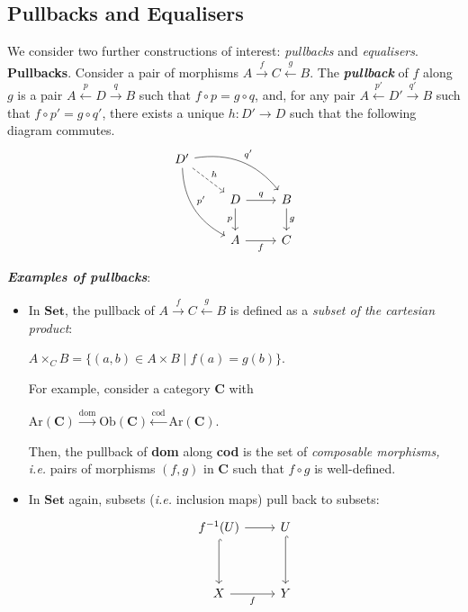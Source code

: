 \documentclass[]{amsbook}
\newcommand{\catname}[1]{\mathbf{#1}}
\newcommand{\0}{\mathbf{0}}
\newcommand{\1}{\mathbf{1}}
\begin{document}
\subsection*{Pullbacks and Equalisers}
We consider two further constructions of interest: \emph{pullbacks} and
\emph{equalisers}.\\

\textbf{Pullbacks}. Consider a pair of morphisms $A \xrightarrow{f} C
\xleftarrow{g} B$. The \emph{\textbf{pullback}} of $f$ along $g$ is a pair
$A \xleftarrow{p} D \xrightarrow{q} B$ such that $f \circ p = g \circ q$, and,
for any pair $A \xleftarrow{p'} D' \xrightarrow{q'} B$ such that $f \circ p' =
g \circ q'$, there exists a unique $h: D' \to D$ such that the following
diagram commutes.
\[
\begin{tikzcd}
    D' \arrow[drr, bend left, "q'"]
       \arrow[ddr, bend right, "p'"]
       \arrow[dr, dashed, "h"] & & \\
    & D \arrow[r, "q"]
        \arrow[d, swap, "p"]
    & B \arrow[d, "g"] \\
    & A \arrow[r, swap, "f"] & C
\end{tikzcd}
\]

\emph{\textbf{Examples of pullbacks}}:
\begin{itemize}
    \item In $\catname{Set}$, the pullback of $A \xrightarrow{f} C
    \xleftarrow{g} B$ is defined as a \emph{subset of the cartesian product}:
    \begin{center}
        $A \times_C B = \{ (a, b) \in A \times B \mid f(a) = g(b) \}$.
    \end{center}
    For example, consider a category $\catname{C}$ with
    \begin{center}
        $\text{Ar}(\catname{C}) \xrightarrow{\text{dom}} \text{Ob}(\catname{C})
        \xleftarrow{\text{cod}} \text{Ar}(\catname{C})$.
    \end{center}
    Then, the pullback of \textbf{dom} along \textbf{cod} is the set of
    \emph{composable morphisms, i.e.} pairs of morphisms $(f, g)$ in
    $\catname{C}$ such that $f \circ g$ is well-defined.
    \item In $\catname{Set}$ again, subsets (\emph{i.e.} inclusion maps) pull
    back to subsets:
    \[
    \begin{tikzcd}
        f^{-1}(U)
            \arrow[r]
            \arrow[dd, hook] &
        U
            \arrow[dd, hook] \\
          & \\
        X
            \arrow[r, swap, "f"] &
        Y
    \end{tikzcd}
    \]
\end{itemize}
\end{document}
